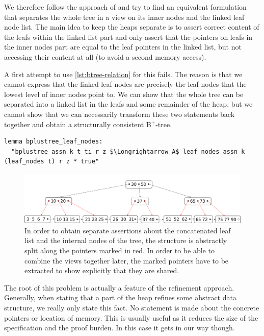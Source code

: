 \documentclass[a4paper,UKenglish,cleveref, autoref, thm-restate]{lipics-v2021}
\newcommand{\btree}{B$^+$-tree}
\begin{document}
We therefore follow the approach of \cite{DBLP:conf/popl/MalechaMSW10} and
try to find an equivalent formulation that separates the whole tree in a
view on its inner nodes and the linked leaf node list.
The main idea to keep the heaps separate is to
assert correct content of the leafs within the linked list part
and only assert that the pointers on leafs in the inner nodes part
are equal to the leaf pointers in the linked list, but not accessing
their content at all (to avoid a second memory access).

A first attempt to use \autoref{lst:btree-relation} for this fails.
The reason is that we cannot express that the linked leaf nodes
are precisely the leaf nodes that the lowest level of inner nodes point to.
We can show that the whole tree can be separated into a linked list in the leafs
and some remainder of the heap, but we cannot show that we can necessarily transform
these two statements back together and obtain a structurally consistent \btree.

\begin{lstlisting}[mathescape=true, language=Isabelle,label=lst:btree-view-split-oneway]
lemma bplustree_leaf_nodes:
  "bplustree_assn k t ti r z $\Longrightarrow_A$ leaf_nodes_assn k (leaf_nodes t) r z * true"
\end{lstlisting}

\begin{figure}
    \centering
    \includegraphics[width=1\linewidth]{btree-view-split.pdf}
    \caption[Split view of the \btree]
    {In order to obtain separate assertions about the concatenated leaf list
    and the internal nodes of the tree, the structure is abstractly split along the
    pointers marked in red. In order to be able to combine the views together later,
    the marked pointers have to be extracted to show explicitly that they are shared.}
    \label{fig:btree-view-split}
\end{figure}

The root of this problem is actually a feature of the refinement approach.
Generally, when stating that a part of the heap
refines some abstract data structure,
we really only state this fact.
No statement is made about the concrete pointers
or location of memory.
This is usually useful as it reduces the size of the specification
and the proof burden.
In this case it gets in our way though.
\end{document}
